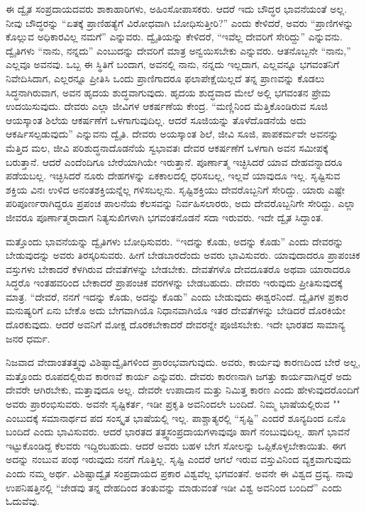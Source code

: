 
ಈ ದ್ವೈತ ಸಂಪ್ರದಾಯದವರು ಶಾಕಾಹಾರಿಗಳು, ಅಹಿಂಸೋಪಾಸಕರು. ಆದರೆ ಇದು ಬೌದ್ಧರ ಭಾವನೆಯಂತೆ ಅಲ್ಲ. ನೀವು ಬೌದ್ಧರನ್ನು “ಏತಕ್ಕೆ ಪ್ರಾಣಿಹತ್ಯೆಗೆ ವಿರೋಧವಾಗಿ ಬೋಧಿಸುತ್ತೀರಿ?” ಎಂದು ಕೇಳಿದರೆ, ಅವರು “ಪ್ರಾಣಿಗಳನ್ನು ಕೊಲ್ಲುವ ಅಧಿಕಾರವಿಲ್ಲ ನಮಗೆ” ಎನ್ನುವರು. ದ್ವೈತಿಯನ್ನು ಕೇಳಿದರೆ, “ಇವೆಲ್ಲ ದೇವರಿಗೆ ಸೇರಿದ್ದು” ಎನ್ನುವನು. ದ್ವೈತಿಗಳು “ನಾನು, ನನ್ನದು” ಎಂಬುದನ್ನು ದೇವರಿಗೆ ಮಾತ್ರ ಅನ್ವಯಿಸಬೇಕು ಎನ್ನುವರು. ಆತನೊಬ್ಬನೇ “ನಾನು,” ಎಲ್ಲವೂ ಅವನವು. ಒಬ್ಬ ಈ ಸ್ಥಿತಿಗೆ ಬಂದಾಗ, ಅವನಲ್ಲಿ ನಾನು, ನನ್ನದು ಇಲ್ಲದಾಗ, ಎಲ್ಲವನ್ನೂ ಭಗವಂತನಿಗೆ ನಿವೇದಿಸಿದಾಗ, ಎಲ್ಲರನ್ನೂ ಪ್ರೀತಿಸಿ ಒಂದು ಪ್ರಾಣಿಗಾದರೂ ಫಲಾಪೇಕ್ಷೆಯಿಲ್ಲದೆ ತನ್ನ ಪ್ರಾಣವನ್ನು ಕೊಡಲು ಸಿದ್ಧನಾಗಿರುವಾಗ, ಅವನ ಹೃದಯ ಶುದ್ಧವಾಗುವುದು. ಹೃದಯ ಶುದ್ಧವಾದ ಮೇಲೆ ಅಲ್ಲಿ ಭಗವಂತನ ಪ್ರೇಮ ಉದಯಿಸುವುದು. ದೇವರು ಎಲ್ಲಾ ಜೀವಿಗಳ ಆಕರ್ಷಣೆಯ ಕೇಂದ್ರ. “ಮಣ್ಣಿನಿಂದ ಮೆತ್ತಿಕೊಂಡಿರುವ ಸೂಜಿ ಆಯಸ್ಕಾಂತ ಶಿಲೆಯ ಆಕರ್ಷಣೆಗೆ ಒಳಗಾಗುವುದಿಲ್ಲ. ಆದರೆ ಸೂಜಿಯನ್ನು ತೊಳೆದೊಡನೆಯೆ ಅದು ಆಕರ್ಷಿಸಲ್ಪಡುವುದು” ಎನ್ನುವನು ದ್ವೈತಿ. ದೇವರು ಅಯಸ್ಕಾಂತ ಶಿಲೆ, ಜೀವಿ ಸೂಜಿ, ಪಾಪಕರ್ಮವೇ ಅವನನ್ನು ಮೆತ್ತಿದ ಮಲ, ಜೀವಿ ಪರಿಶುದ್ಧನಾದೊಡನೆಯೆ ಸ್ವಭಾವತಃ ದೇವರ ಆಕರ್ಷಣೆಗೆ ಒಳಗಾಗಿ ಅವನ ಸಮೀಪಕ್ಕೆ ಬರುತ್ತಾನೆ. ಆದರೆ ಎಂದೆಂದಿಗೂ ಬೇರೆಯಾಗಿಯೇ ಇರುತ್ತಾನೆ. ಪೂರ್ಣಾತ್ಮ ಇಚ್ಛಿಸಿದರೆ ಯಾವ ದೇಹವನ್ನಾದರೂ ಪಡೆಯಬಲ್ಲ. ಇಚ್ಛಿಸಿದರೆ ನೂರು ದೇಹಗಳನ್ನು ಏಕಕಾಲದಲ್ಲಿ ಧರಿಸಬಲ್ಲ, ಇಲ್ಲವೆ ಯಾವುದೂ ಇಲ್ಲ. ಸೃಷ್ಟಿಸುವ ಶಕ್ತಿಯ ವಿನಃ ಉಳಿದ ಅನಂತಶಕ್ತಿಯನ್ನೆಲ್ಲ ಗಳಿಸಬಲ್ಲನು. ಸೃಷ್ಟಿಶಕ್ತಿಯು ದೇವರೊಬ್ಬನಿಗೆ ಸೇರಿದ್ದು. ಯಾರು ಎಷ್ಟೇ ಪರಿಪೂರ್ಣರಾಗಿದ್ದರೂ ಪ್ರಪಂಚ ಪಾಲನೆಯ ಕೆಲಸವನ್ನು ನಿರ್ವಹಿಸಲಾರರು, ಅದು ದೇವರೊಬ್ಬನಿಗೇ ಸೇರಿದ್ದು. ಎಲ್ಲಾ ಜೀವರೂ ಪೂರ್ಣಾತ್ಮರಾದಾಗ ನಿತ್ಯಸುಖಿಗಳಾಗಿ ಭಗವಂತನೊಡನೆ ಸದಾ ಇರುವರು. ಇದೇ ದ್ವೈತ ಸಿದ್ಧಾಂತ.

ಮತ್ತೊಂದು ಭಾವನೆಯನ್ನು ದ್ವೈತಿಗಳು ಬೋಧಿಸುವರು. “ಇದನ್ನು ಕೊಡು, ಅದನ್ನು ಕೊಡು” ಎಂದು ದೇವರನ್ನು ಬೇಡುವುದನ್ನು ಅವರು ತಿರಸ್ಕರಿಸುವರು. ಹೀಗೆ ಬೇಡಬಾರದೆಂದು ಅವರು ಭಾವಿಸುವರು. ಯಾವುದಾದರೂ ಪ್ರಾಪಂಚಿಕ ವಸ್ತುಗಳು ಬೇಕಾದರೆ ಕೆಳಗಿರುವ ದೇವತೆಗಳನ್ನು ಬೇಡಬೇಕು. ದೇವತೆಗಳೊ ದೇವದೂತರೊ ಅಥವಾ ಯಾರಾದರೂ ಸಿದ್ಧರೊ ಇಂತಹವರಿಂದ ಬೇಕಾದರೆ ಪ್ರಾಪಂಚಿಕ ವರಗಳನ್ನು ಬೇಡಬಹುದು. ದೇವರು ಇರುವುದು ಪ್ರೀತಿಸುವುದಕ್ಕೆ ಮಾತ್ರ. “ದೇವರೆ, ನನಗೆ ಇದನ್ನು ಕೊಡು, ಅದನ್ನು ಕೊಡು” ಎಂದು ಬೇಡುವುದು ಈಶ್ವರನಿಂದೆ. ದ್ವೈತಿಗಳ ಪ್ರಕಾರ ಮನುಷ್ಯರಿಗೆ ಏನು ಬೇಕೊ ಅದು ಬೇಗವಾಗಿಯೊ ನಿಧಾನವಾಗಿಯೊ ಇತರ ದೇವತೆಗಳನ್ನು ಬೇಡಿದರೆ ದೊರಕಿಯೇ ದೊರಕುವುದು. ಆದರೆ ಅವನಿಗೆ ಮೋಕ್ಷ ದೊರಕಬೇಕಾದರೆ ದೇವರನ್ನೇ ಪೂಜಿಸಬೇಕು. ಇದೇ ಭಾರತದ ಸಾಮಾನ್ಯ ಜನರ ಧರ್ಮ.

\newpage

ನಿಜವಾದ ವೇದಾಂತತತ್ತ್ವವು ವಿಶಿಷ್ಟಾದ್ವೈತಿಗಳಿಂದ ಪ್ರಾರಂಭವಾಗುವುದು. ಅವರು, ಕಾರ್ಯವು ಕಾರಣದಿಂದ ಬೇರೆ ಅಲ್ಲ, ಮತ್ತೊಂದು ರೂಪದಲ್ಲಿರುವ ಕಾರಣವೆ ಕಾರ್ಯ ಎನ್ನುವರು. ದೇವರು ಕಾರಣನಾಗಿ ಜಗತ್ತು ಕಾರ್ಯವಾಗಿದ್ದರೆ ಅದು ದೇವರೇ ಆಗಿರಬೇಕು, ಮತ್ತಾವುದೂ ಅಲ್ಲ. ದೇವರೇ ಉಪಾದಾನ ಮತ್ತು ನಿಮಿತ್ತ ಕಾರಣ ಎಂದು ಹೇಳುವುದರೊಂದಿಗೆ ಅವರು ಪ್ರಾರಂಭಿಸುವರು. ಅವನೇ ಸೃಷ್ಟಿಕರ್ತ, ಇಡೀ ಪ್ರಕೃತಿ ಅವನಿಂದಲೇ ಬಂದಿದೆ. ನಿಮ್ಮ ಭಾಷೆಯಲ್ಲಿರುವ "" ಎಂಬುದಕ್ಕೆ ಸಮಾನಾರ್ಥದ ಪದ ಸಂಸ್ಕೃತ ಭಾಷೆಯಲ್ಲಿ ಇಲ್ಲ. ಪಾಶ್ಚಾತ್ಯರಲ್ಲಿ “ಸೃಷ್ಟಿ” ಎಂದರೆ ಶೂನ್ಯದಿಂದ ಏನೊ ಬಂದಿದೆ ಎಂದು ಭಾವಿಸುವರು. ಆದರೆ ಭಾರತದ ತತ್ತ್ವಸಂಪ್ರದಾಯಗಳಾವುವೂ ಹಾಗೆ ನಂಬುವುದಿಲ್ಲ. ಹಾಗೆ ಭಾವನೆ ಇಟ್ಟುಕೊಂಡಿದ್ದ ಕೆಲವರು ಇದ್ದಿರಬಹುದು. ಆದರೆ ಅವರು ಬಹಳ ಬೇಗ ಸೋಲನ್ನು ಒಪ್ಪಿಕೊಳ್ಳಬೇಕಾಯಿತು. ಈಗ ಅದನ್ನು ನಂಬುವ ಪಂಥ ಇರುವುದು ನನಗೆ ಗೊತ್ತಿಲ್ಲ. ಸೃಷ್ಟಿ ಎಂದರೆ ಆಗಲೆ ಇರುವ ವಸ್ತುವಿನಿಂದ ವ್ಯಕ್ತವಾಗುವುದು ಎಂದು ನಮ್ಮ ಅರ್ಥ. ವಿಶಿಷ್ಟಾದ್ವೈತ ಸಂಪ್ರದಾಯದ ಪ್ರಕಾರ ವಿಶ್ವವೆಲ್ಲ ಭಗವಂತನೆ. ಅವನೇ ಈ ವಿಶ್ವದ ದ್ರವ್ಯ. ನಾವು ಉಪನಿಷತ್ತಿನಲ್ಲಿ “ಜೇಡವು ತನ್ನ ದೇಹದಿಂದ ತಂತುವನ್ನು ಮಾಡುವಂತೆ ಇಡೀ ವಿಶ್ವ ಅವನಿಂದ ಬಂದಿದೆ” ಎಂದು ಓದುವೆವು.

